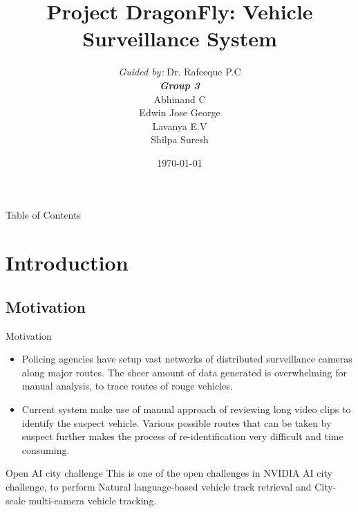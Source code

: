 \documentclass{beamer}
\title[DragonFly]{Project DragonFly: Vehicle Surveillance System}
\institute[GCEK-CSE]{Department of Computer Science and Engineering \\Government College of Engineering Kannur}
\author[Group 3]{
	{\small \textit{Guided by:}} Dr. Rafeeque P.C \\
	\medskip
	{\small \textbf{\textit{Group 3}}} \\
	Abhinand C \\ Edwin Jose George \\ Lavanya E.V \\ Shilpa Suresh
}
\date{\today}
\begin{document}
	

	\begin{frame}
	\titlepage
	\end{frame}

	\begin{frame}{Table of Contents}
	\tableofcontents
	\end{frame}



	\section{Introduction}
	\subsection{Motivation}
	\begin{frame}{Motivation}
		\begin{itemize}
			\item Policing agencies have setup vast networks of distributed surveillance cameras along major routes. The sheer amount of data generated is overwhelming for manual analysis, to trace routes of rouge vehicles.
			\item Current system make use of manual approach of reviewing long video
			clips to identify the suspect vehicle. Various possible routes that can
			be taken by suspect further makes the process of re-identification very
			difficult and time consuming.		
		\end{itemize}
		
		\begin{block}{Open AI city challenge}
			This is one of the open challenges in NVIDIA AI city challenge, to perform Natural language-based vehicle track retrieval and City-scale multi-camera vehicle tracking.
		\end{block}
		
	\end{frame}
\end{document}
